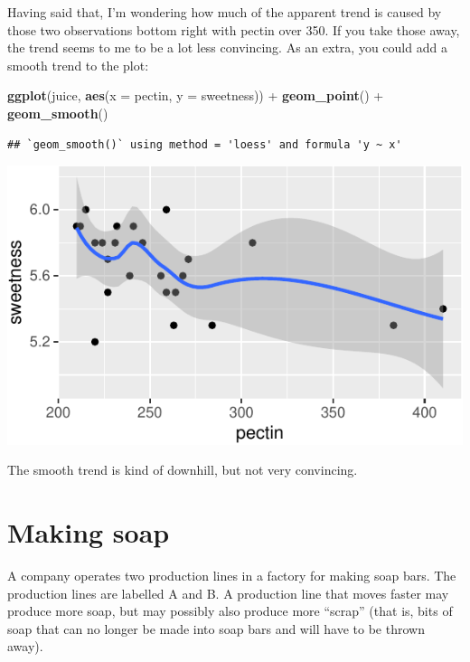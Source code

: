 \documentclass[]{tufte-book}
\newenvironment{Shaded}{}{}
\newcommand{\DataTypeTok}[1]{\textcolor[rgb]{0.56,0.13,0.00}{#1}}
\newcommand{\KeywordTok}[1]{\textcolor[rgb]{0.00,0.44,0.13}{\textbf{#1}}}
\newcommand{\NormalTok}[1]{#1}
\newcommand{\OperatorTok}[1]{\textcolor[rgb]{0.40,0.40,0.40}{#1}}
\newcommand{\StringTok}[1]{\textcolor[rgb]{0.25,0.44,0.63}{#1}}
\theoremstyle{definition}
\theoremstyle{definition}
\theoremstyle{definition}
\theoremstyle{remark}
\begin{document}
Having said that, I'm wondering how much of the apparent trend is caused
by those two observations bottom right with pectin over 350. If you take
those away, the trend seems to me to be a lot less convincing. As an
extra, you could add a smooth trend to the plot:

\begin{Shaded}
\begin{Highlighting}[]
\KeywordTok{ggplot}\NormalTok{(juice, }\KeywordTok{aes}\NormalTok{(}\DataTypeTok{x =}\NormalTok{ pectin, }\DataTypeTok{y =}\NormalTok{ sweetness)) }\OperatorTok{+}\StringTok{ }
\StringTok{    }\KeywordTok{geom_point}\NormalTok{() }\OperatorTok{+}\StringTok{ }\KeywordTok{geom_smooth}\NormalTok{()}
\end{Highlighting}
\end{Shaded}

\begin{verbatim}
## `geom_smooth()` using method = 'loess' and formula 'y ~ x'
\end{verbatim}

\includegraphics{02-reading-in_files/figure-latex/unnamed-chunk-9-1}

The smooth trend is kind of downhill, but not very convincing.

\hypertarget{making-soap}{%
\section{Making soap}\label{making-soap}}

A company operates two production lines in a factory for making soap
bars. The production lines are labelled A and B. A production line that
moves faster may produce more soap, but may possibly also produce more
``scrap'' (that is, bits of soap that can no longer be made into soap
bars and will have to be thrown away).
\end{document}
